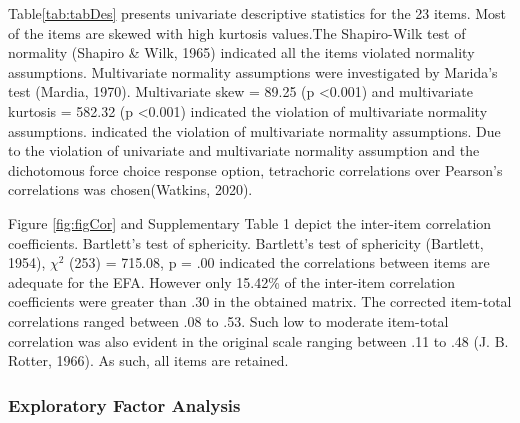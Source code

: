 \documentclass[
  english,
  man]{apa6}
\begin{document}
\begin{table}[tbp]
\begin{center}
\begin{threeparttable}
\end{threeparttable}
\end{center}

\end{table}

Table\ref{tab:tabDes} presents univariate descriptive statistics for the 23 items. Most of the items are skewed with high kurtosis values.The Shapiro-Wilk test of normality (Shapiro \& Wilk, 1965) indicated all the items violated normality assumptions. Multivariate normality assumptions were investigated by Marida's test (Mardia, 1970). Multivariate skew = 89.25 (p \textless0.001) and multivariate kurtosis = 582.32 (p \textless0.001) indicated the violation of multivariate normality assumptions. indicated the violation of multivariate normality assumptions. Due to the violation of univariate and multivariate normality assumption and the dichotomous force choice response option, tetrachoric correlations over Pearson's correlations was chosen(Watkins, 2020).

Figure \ref{fig:figCor} and Supplementary Table 1 depict the inter-item correlation coefficients. Bartlett's test of sphericity. Bartlett's test of sphericity (Bartlett, 1954), \(\chi^2\) (253) = 715.08, p = .00 indicated the correlations between items are adequate for the EFA. However only 15.42\% of the inter-item correlation coefficients were greater than .30 in the obtained matrix. The corrected item-total correlations ranged between .08 to .53. Such low to moderate item-total correlation was also evident in the original scale ranging between .11 to .48 (J. B. Rotter, 1966). As such, all items are retained.

\hypertarget{exploratory-factor-analysis}{%
\subsubsection{Exploratory Factor Analysis}\label{exploratory-factor-analysis}}
\end{document}
